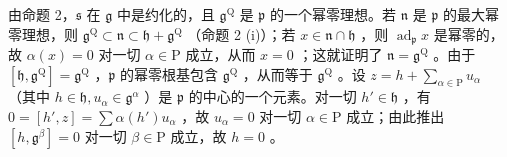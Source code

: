 由命题 2，\(\mathfrak{s}\) 在 \(\mathfrak{g}\) 中是约化的，且 \(\mathfrak{g}^{\mathrm{Q}}\) 是 \(\mathfrak{p}\) 的一个幂零理想。若 \(\mathfrak{n}\) 是 \(\mathfrak{p}\) 的最大幂零理想，则 \(\mathfrak{g}^{\mathrm{Q}} \subset \mathfrak{n} \subset \mathfrak{h} + \mathfrak{g}^{\mathrm{Q}}\) （命题 2 (i)）；若 \(x \in \mathfrak{n} \cap \mathfrak{h}\) ，则 \(\operatorname{ad}_{\mathfrak{p}} x\) 是幂零的，故 \(\alpha(x) = 0\) 对一切 \(\alpha \in \mathrm{P}\) 成立，从而 \(x = 0\) ；这就证明了 \(\mathfrak{n} = \mathfrak{g}^{\mathrm{Q}}\) 。由于 \([\mathfrak{h}, \mathfrak{g}^{\mathrm{Q}}] = \mathfrak{g}^{\mathrm{Q}}\) ，\(\mathfrak{p}\) 的幂零根基包含 \(\mathfrak{g}^{\mathrm{Q}}\) ，从而等于 \(\mathfrak{g}^{\mathrm{Q}}\) 。设 \(z = h + \sum_{\alpha \in \mathrm{P}} u_{\alpha}\) （其中 \(h \in \mathfrak{h}, u_{\alpha} \in \mathfrak{g}^{\alpha}\) ）是 \(\mathfrak{p}\) 的中心的一个元素。对一切 \(h' \in \mathfrak{h}\) ，有 \(0 = [h', z] = \sum \alpha(h')u_{\alpha}\) ，故 \(u_{\alpha} = 0\) 对一切 \(\alpha \in \mathrm{P}\) 成立；由此推出 \([h, \mathfrak{g}^{\beta}] = 0\) 对一切 \(\beta \in \mathrm{P}\) 成立，故 \(h = 0\) 。

